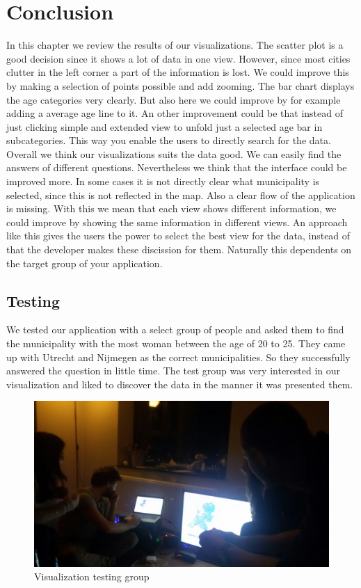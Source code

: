 \documentclass[a4paper,twoside,11pt]{article}
\begin{document}
\section{Conclusion}
In this chapter we review the results of our visualizations. \newline
The scatter plot is a good decision since it shows a lot of data in one view. However, since most cities clutter in the left corner a part of the information is lost. We could improve this by making a selection of points possible and add zooming. \newline
The bar chart displays the age categories very clearly. But also here we could improve by for example adding a average age line to it. An other improvement could be that instead of just clicking simple and extended view to unfold just a selected age bar in subcategories. This way you enable the users to directly search for the data. \newline
Overall we think our visualizations suits the data good. We can easily find the answers of different questions. Nevertheless we think that the interface could be improved more. In some cases it is not directly clear what municipality is selected, since this is not reflected in the map. Also a clear flow of the application is missing. With this we mean that each view shows different information, we could improve by showing the same information in different views. An approach like this gives the users the power to select the best view for the data, instead of that the developer makes these discission for them. Naturally this dependents on the target group of your application.

\subsection{Testing}
We tested our application with a select group of people and asked them to find the municipality with the most woman between the age of 20 to 25. They came up with Utrecht and Nijmegen as the correct municipalities. So they successfully answered the question in little time. The test group was very interested in our visualization and liked to discover the data in the manner it was presented them.

\begin{figure}[h]
        \centering
        \includegraphics[width=\textwidth]{Conclusion/Conclusion1.jpg}
        \caption{Visualization testing group}
        \label{fig:numberOfInhabitants}
\end{figure}
\end{document}
